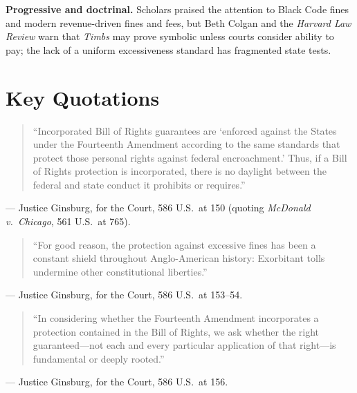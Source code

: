 \documentclass[12pt]{article}
\begin{document}
\textbf{Progressive and doctrinal.} Scholars praised the attention to Black Code fines and modern revenue-driven fines and fees, but Beth Colgan and the \textit{Harvard Law Review} warn that \textit{Timbs} may prove symbolic unless courts consider ability to pay; the lack of a uniform excessiveness standard has fragmented state tests.

\section{Key Quotations}

\begin{quote}
``Incorporated Bill of Rights guarantees are `enforced against the States under the Fourteenth Amendment according to the same standards that protect those personal rights against federal encroachment.' Thus, if a Bill of Rights protection is incorporated, there is no daylight between the federal and state conduct it prohibits or requires.''
\end{quote}
\noindent --- Justice Ginsburg, for the Court, 586 U.S.\ at 150 (quoting \textit{McDonald v.\ Chicago}, 561 U.S.\ at 765).

\begin{quote}
``For good reason, the protection against excessive fines has been a constant shield throughout Anglo-American history: Exorbitant tolls undermine other constitutional liberties.''
\end{quote}
\noindent --- Justice Ginsburg, for the Court, 586 U.S.\ at 153--54.

\begin{quote}
``In considering whether the Fourteenth Amendment incorporates a protection contained in the Bill of Rights, we ask whether the right guaranteed---not each and every particular application of that right---is fundamental or deeply rooted.''
\end{quote}
\noindent --- Justice Ginsburg, for the Court, 586 U.S.\ at 156.
\end{document}
